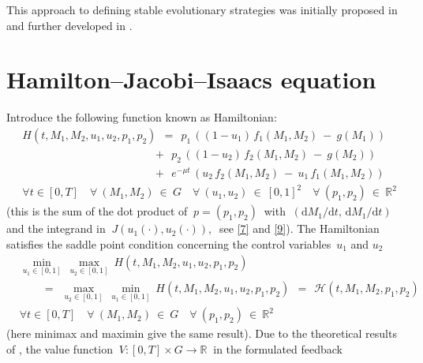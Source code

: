 \documentclass[11pt]{amsart}
\begin{document}
This approach to defining stable evolutionary strategies was initially proposed
in \cite{BernhardGrognardMailleretAkhmetzhanov2010} and further developed
in \cite{YegorovGrognardMailleretHalkettBernhard2019}.


\section{Hamilton--Jacobi--Isaacs equation}

Introduce the following function known as Hamiltonian:
\begin{equation}
\begin{aligned}
& H(t, M_1, M_2, u_1, u_2, p_1, p_2) \:\: = \:\:
p_1 \, \left((1 - u_1) \, f_1(M_1, M_2) \: - \: g(M_1)\right) \\
& \qquad\qquad\qquad\qquad\qquad\quad \:\:\:\,
+ \:\: p_2 \, \left((1 - u_2) \, f_2(M_1, M_2) \: - \: g(M_2)\right) \\
& \qquad\qquad\qquad\qquad\qquad\quad \:\:\:\,
+ \:\: e^{-\mu t} \, (u_2 \, f_2(M_1, M_2) \: - \: u_1 \, f_1(M_1, M_2)) \\
& \forall t \in [0, T] \quad \forall \: (M_1, M_2) \: \in \: G \quad \forall
  \: (u_1, u_2) \: \in \: [0, 1]^2 \quad
\forall \: (p_1, p_2) \: \in \: \mathbb{R}^2
\end{aligned}  \label{12}
\end{equation}
(this is the sum of the dot product of $ \: p = (p_1, p_2) \: $ with
$ \: (\mathrm{d} M_1 / \mathrm{d} t, \, \mathrm{d} M_1 / \mathrm{d} t) \: $ and
the integrand in $ \: J(u_1(\cdot), u_2(\cdot)), \: $ see \cref{7} and
\cref{9}). The Hamiltonian satisfies the saddle point condition concerning
the control variables~$ u_1 $ and
$ u_2 $
\begin{equation}
\begin{aligned}
& \min_{u_1 \in [0, 1]} \: \max_{u_2 \in [0, 1]} \: H(t, M_1, M_2, u_1, u_2,
  p_1, p_2) \\
& \qquad
= \:\: \max_{u_2 \in [0, 1]} \: \min_{u_1 \in [0, 1]} \: H(t, M_1, M_2, u_1,
  u_2, p_1, p_2) \:\:
= \:\: \mathcal{H} (t, M_1, M_2, p_1, p_2) \\
& \forall t \in [0, T] \quad \forall \: (M_1, M_2) \: \in \: G \quad \forall
  \: (p_1, p_2) \: \in \: \mathbb{R}^2
\end{aligned}  \label{13}
\end{equation}
(here minimax and maximin give the same result). Due to the theoretical
results of \cite[\S XI.6]{FlemingSoner2006}, the value function 
$ \: V \colon [0, T] \times G \to \mathbb{R} \: $ in the formulated feedback
\end{document}
